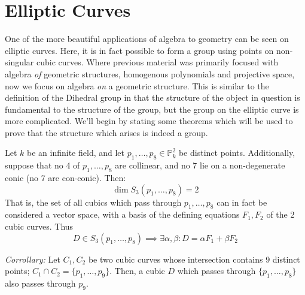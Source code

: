 \section{Elliptic Curves}

One of the more beautiful applications of algebra to
geometry can be seen on elliptic curves. Here, it is in
fact possible to form a group using points on non-singular
cubic curves. Where previous material was primarily focused
with algebra \emph{of} geometric structures, homogenous
polynomials and projective space, now we focus on 
algebra \emph{on} a geometric structure. This is similar to
the definition of the Dihedral group in that the
structure of the object in question is fundamental to the
structure of the group, but the group on the elliptic curve
is more complicated. We'll begin by stating some theorems
which will be used to prove that the structure which
arises is indeed a group.

\begin{theorem}
\label{thm:cubicintersectionpoints}
Let $k$ be an infinite field, and let $p_1, \dots, p_8 \in \mathbb{P}^2_k$
be distinct points. Additionally, suppose that no 4 of $p_1, \dots, p_8$ are
collinear, and no 7 lie on a non-degenerate conic (no 7 are con-conic). Then:
\[
	\dim S_3(p_1, \dots, p_8) = 2
\]
That is, the set of all cubics which pass through $p_1, \dots, p_8$ can in
fact be considered a vector space, with a basis of the defining equations $F_1, F_2$
of the 2 cubic curves. Thus
\[
	D \in S_3(p_1, \dots, p_8) \implies \exists \alpha, \beta : D = \alpha F_1 + \beta F_2
\]
\end{theorem}

\begin{theorem}
\emph{Corrollary:}
Let $C_1, C_2$ be two cubic curves whose intersection contains 9 distinct points;
$C_1 \cap C_2 = \{p_1, \dots, p_9\}$. Then, a cubic $D$ which passes through 
$\{p_1, \dots, p_8\}$ also passes through $p_9$.
\end{theorem}

